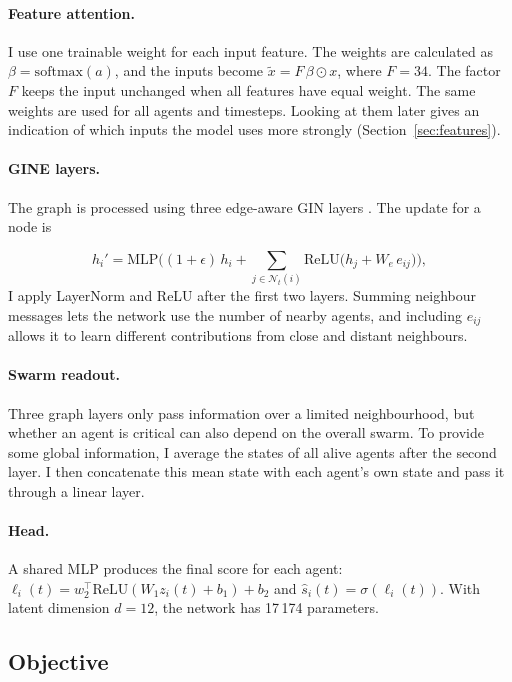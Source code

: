 \documentclass[11pt,a4paper]{article}
\begin{document}
\paragraph{Feature attention.} I use one trainable weight for each input feature. The weights are calculated as
$\beta=\mathrm{softmax}(a)$, and the inputs become $\tilde x=F\,\beta\odot x$, where $F=34$.
The factor $F$ keeps the input unchanged when all features have equal weight. The same weights are used for all
agents and timesteps. Looking at them later gives an indication of which inputs the model uses more strongly
(Section~\ref{sec:features}).

\paragraph{GINE layers.} The graph is processed using three edge-aware GIN layers \cite{xu2019gin,hu2020gine}.
The update for a node is

\begin{equation}
h_i'=\mathrm{MLP}\Big((1+\epsilon)\,h_i+\sum_{j\in\mathcal{N}_t(i)}\mathrm{ReLU}\big(h_j+W_e\,e_{ij}\big)\Big),
\end{equation}
I apply LayerNorm and ReLU after the first two layers. Summing neighbour messages lets the network use the number
of nearby agents, and including $e_{ij}$ allows it to learn different contributions from close and distant neighbours.

\paragraph{Swarm readout.} Three graph layers only pass information over a limited neighbourhood, but whether an
agent is critical can also depend on the overall swarm. To provide some global information, I average the states
of all alive agents after the second layer. I then concatenate this mean state with each agent's own state and
pass it through a linear layer.

\paragraph{Head.} A shared MLP produces the final score for each agent:
$\ell_i(t)=w_2^{\top}\mathrm{ReLU}(W_1z_i(t)+b_1)+b_2$ and
$\hat s_i(t)=\sigma(\ell_i(t))$. With latent dimension $d=12$, the network has 17\,174 parameters.

\subsection{Objective}
\end{document}
